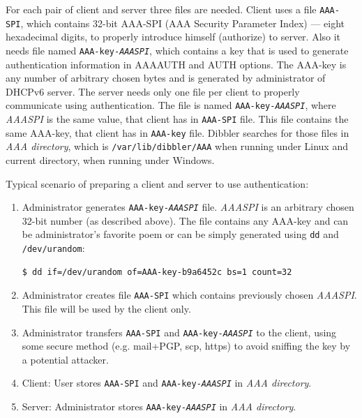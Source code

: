 For each pair of client and server three files are needed. Client uses
a file \texttt{AAA-SPI}, which contains 32-bit AAA-SPI (AAA Security
Parameter Index) --- eight hexadecimal digits, to properly introduce
himself (authorize) to server. Also it needs file named \texttt{AAA-key-\textit{AAASPI}},
which contains a key that is used to generate authentication information
in AAAAUTH and AUTH options. The AAA-key is any number of arbitrary chosen
bytes and is generated by administrator of DHCPv6 server. The server needs
only one file per client to properly communicate using authentication. The
file is named \texttt{AAA-key-\textit{AAASPI}}, where \textit{AAASPI} is the
same value, that client has in \texttt{AAA-SPI} file. This file contains the
same AAA-key, that client has in \texttt{AAA-key} file. Dibbler searches for
those files in \textit{AAA directory}, which is \texttt{/var/lib/dibbler/AAA}
when running under Linux and current directory, when running under Windows.

Typical scenario of preparing a client and server to use authentication:
\begin{enumerate}
 \item Administrator generates \texttt{AAA-key-\textit{AAASPI}} file. \textit{AAASPI}
is an arbitrary chosen 32-bit number (as described above). The file contains any AAA-key
and can be administrator's favorite poem or can be simply generated using \texttt{dd}
and \texttt{/dev/urandom}:
\begin{lstlisting}
$ dd if=/dev/urandom of=AAA-key-b9a6452c bs=1 count=32
\end{lstlisting}

\item Administrator creates file \texttt{AAA-SPI} which contains previously chosen
\textit{AAASPI}. This file will be used by the client only.

\item Administrator transfers \texttt{AAA-SPI} and \texttt{AAA-key-\textit{AAASPI}} to the client, using
some secure method (e.g. mail+PGP, scp, https) to avoid sniffing the key by a potential
attacker.

\item Client: User stores \texttt{AAA-SPI} and \texttt{AAA-key-\textit{AAASPI}} in \textit{AAA directory}.

\item Server: Administrator stores \texttt{AAA-key-\textit{AAASPI}} in \textit{AAA directory}.

\end{enumerate}

